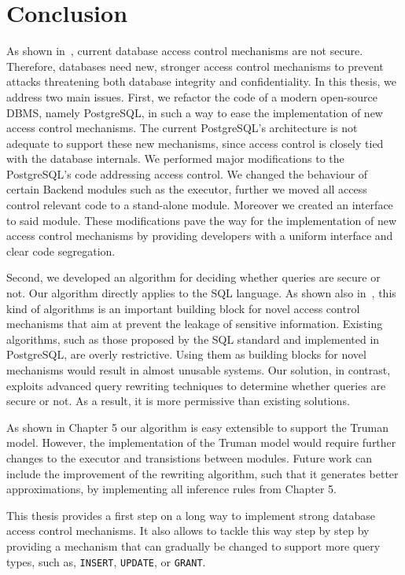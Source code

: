 \section{Conclusion}

As shown in~\cite{guarnieri2016strong}, current database access control mechanisms are not secure.
%
Therefore, databases need new, stronger access control mechanisms to prevent attacks threatening both database integrity and confidentiality.
%
In this thesis, we address two main issues.
%
First, we refactor the code of a modern open-source DBMS, namely PostgreSQL, in such a way to ease the implementation of new access control mechanisms.
%
The current PostgreSQL's architecture is not adequate to support these new mechanisms, since access control is closely tied with the database internals.
%
We performed  major modifications to the PostgreSQL's code addressing access control.
%
We changed the behaviour of certain Backend modules such as the executor, further we moved all access control relevant code to a stand-alone module. 
%
Moreover we created an interface to said module.
%
These modifications pave the way for the implementation of new access control mechanisms by providing developers with a uniform interface and clear code segregation.


Second, we developed an algorithm for deciding whether queries are secure or not.
%
Our algorithm directly applies to the SQL language.
%
As shown also in~\cite{guarnieri2016strong}, this kind of algorithms is an important building block for novel access control mechanisms that aim at prevent the leakage of sensitive information.
%
Existing algorithms, such as those proposed by the SQL standard and implemented in PostgreSQL, are overly restrictive.
%
Using them as building blocks for novel mechanisms would result in almost unusable systems.
%
Our solution, in contrast, exploits advanced query rewriting techniques to determine whether queries are secure or not. 
%
As a result, it is more permissive than existing solutions.

As shown in Chapter 5 our algorithm is easy extensible to support the Truman model.
%
However, the implementation of the Truman model would require further changes to the executor and transistions between modules.
%
Future work can include the improvement of the rewriting algorithm, such that it generates better approximations, by implementing all inference rules from Chapter 5. 

This thesis provides a first step on a long way to implement strong database access control mechanisms.
%
It also allows to tackle this way step by step by providing a mechanism that can gradually be changed to support more query types, such as, \texttt{INSERT}, \texttt{UPDATE}, or \texttt{GRANT}.
